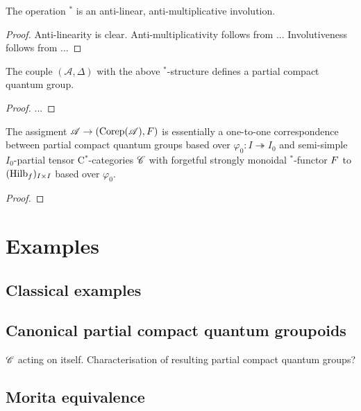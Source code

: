 \begin{Lem} The operation $^*$ is an anti-linear, anti-multiplicative involution.
\end{Lem}

\begin{proof} Anti-linearity is clear. Anti-multiplicativity follows from ... Involutiveness follows from ...

\end{proof}

\begin{Prop} The couple $(\mathscr{A},\Delta)$ with the above $^*$-structure defines a partial compact quantum group.
\end{Prop}
\begin{proof} ...

\end{proof} 

\begin{Theorem} \label{TheoTKPCQG} The assigment $\mathscr{A}\rightarrow (\mathrm{Corep}(\mathscr{A}),F)$ is essentially a one-to-one correspondence between partial compact quantum groups based over $\varphi_0:I\twoheadrightarrow I_0$ and semi-simple $I_0$-partial tensor C$^*$-categories $\mathscr{C}$ with forgetful strongly monoidal $^*$-functor $F$ to $(\mathrm{Hilb}_f)_{I\times I}$ based over $\varphi_0$.
\end{Theorem} 

\begin{proof}

\end{proof}

\section{Examples}

\subsection{Classical examples}


\subsection{Canonical partial compact quantum groupoids}

$\mathscr{C}$ acting on itself. Characterisation of resulting partial compact quantum groups? 

\subsection{Morita equivalence}

